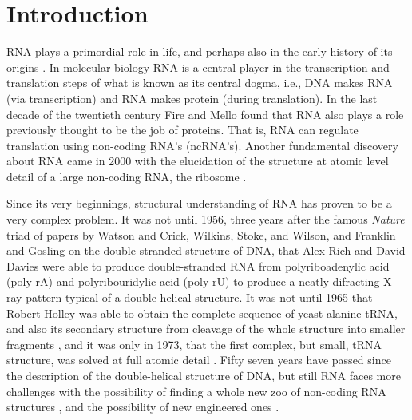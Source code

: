 \chapter{Introduction}
\label{introduction} 

RNA plays  a primordial role  in life, and  perhaps also in  the early
history   of  its   origins  \cite{woese1967,   crick1968,  orgel1968,
  orgel2004}.  In  molecular biology  RNA is a  central player  in the
transcription and  translation steps of  what is known as  its central
dogma, i.e., DNA  makes RNA (via transcription) and  RNA makes protein
(during translation).
In  the  last   decade  of  the  twentieth  century   Fire  and  Mello
\cite{fire1998} found that RNA also plays a role previously thought to
be the  job of proteins. That  is, RNA can  regulate translation using
non-coding RNA's  (ncRNA's).  Another fundamental  discovery about RNA
came in  2000 with  the elucidation of  the structure at  atomic level
detail of  a large non-coding RNA,  the ribosome \cite{schluenzen2000,
  ban2000, wimberly2000}.

Since its very beginnings,  structural understanding of RNA has proven
to be a very complex problem. It was not until 1956, three years after
the  famous  \textit{Nature} triad  of  papers  by  Watson and  Crick,
Wilkins,    Stoke,   and    Wilson,   and    Franklin    and   Gosling
\cite{watson1953a,  wilkins1953, franklin1953} on  the double-stranded
structure of DNA, that Alex Rich and David Davies were able to produce
double-stranded   RNA  from   polyriboadenylic   acid  (poly-rA)   and
polyribouridylic acid  (poly-rU) to produce a  neatly difracting X-ray
pattern typical of  a double-helical structure. It was  not until 1965
that Robert Holley  was able to obtain the  complete sequence of yeast
alanine tRNA,  and also its  secondary structure from cleavage  of the
whole structure  into smaller fragments \cite{holley1965},  and it was
only in 1973,  that the first complex, but  small, tRNA structure, was
solved at full  atomic detail \cite{robertus1974, kim1974, stout1976}.
Fifty  seven   years  have  passed   since  the  description   of  the
double-helical structure  of DNA, but still RNA  faces more challenges
with  the possibility of  finding a  whole new  zoo of  non-coding RNA
structures \cite{weinberg2009}, and  the possibility of new engineered
ones \cite{severcan2009}.

